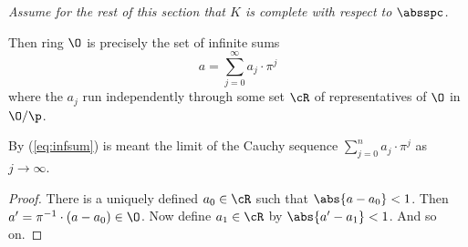 {\em Assume for the rest of this section that $K$ is complete with
  respect to $\absspc$.}
\begin{lemma}
Then ring $\O$ is precisely the set of infinite sums 
\begin{equation}\label{eq:infsum}
  a = \sum_{j=0}^{\infty} a_j \cdot \pi^j
\end{equation}
where the $a_j$ run independently through some set $\cR$ of
representatives of $\O$ in $\O/\p$.
\end{lemma}
By (\ref{eq:infsum}) is meant the limit of the Cauchy sequence
$\sum_{j=0}^n a_j\cdot \pi^j$ as $j\to\infty$.
\begin{proof}
There is a uniquely defined $a_0\in \cR$ such that $\abs{a-a_0}<1$.
Then $a' = \pi^{-1}\cdot (a-a_0) \in \O$.  Now define
$a_1\in \cR$ by $\abs{a'-a_1}<1$.  And so on.
\end{proof}
